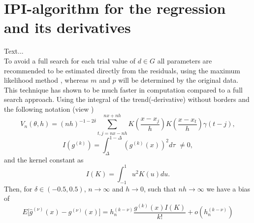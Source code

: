 \documentclass[12pt]{article}
\begin{document}
\section{IPI-algorithm for the regression and its derivatives}
\label{section 3}
Text...\\
To avoid a full search for each trial value of \(d \in G\) all parameters are recommended to be estimated directly from the residuals, using the maximum likelihood method \parencite{beran2002semifar}, 
whereas \(m\) and \(p\) will be determined by the original data.
This technique has shown to be much faster in computation compared to a full search approach. 
Using the integral of the trend(-derivative) without borders %
and the following notation (view \textcite{beran2002local})
\begin{equation}
\label{eq:Variance}
V_{n}(\theta,h) = (nh)^{-1-2\delta} \sum_{t,j=nx-nh}^{nx+nh} K\left( \frac{x-x_j}{h}\right) K\left( \frac{x-x_t}{h}\right)\gamma(t-j),
\end{equation}
\begin{equation} 
\label{eq:IntegratedTrendDerivatives}
I(g^{(k)}) = \int_{\Delta}^{1-\Delta} \left( g^{(k)}(x) \right)^2 d\tau\,\, \neq 0 ,
\end{equation} 
and the kernel constant as  %
\begin{equation}
\label{eq:IntegratedKernel}
I(K) = \int_{-1}^{1} u^{2}K(u)du.
\end{equation}
Then, for \( \delta \in (-0.5,0.5) \), \(n \rightarrow \infty \) and \( h \rightarrow 0 \), such that \( nh \rightarrow \infty \) we have a bias of 
\begin{equation}
\label{eq:Bias}
	E\big[\hat{g}^{(\nu)}(x) - g^{(\nu)}(x) \big] = h_{n}^{(k-\nu)} \frac{g^{(k)}(x)I(K)}{k!} + o(h_{n}^{(k-\nu)})
\end{equation}
\end{document}
